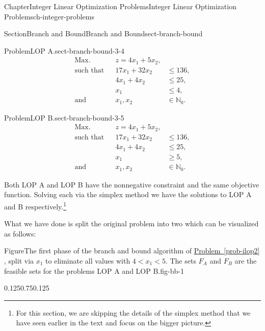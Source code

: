 \documentclass[oneside,10pt,]{book}
\newcommand{\xreffont}{\relax}
\numberwithin{equation}{section}
\newcommand{\lt}{<}
\newcommand{\amp}{&}
\begin{document}
\begin{chapterptx}{Chapter}{Integer Linear Optimization Problems}{}{Integer Linear Optimization Problems}{}{}{ch-integer-problems}
\begin{sectionptx}{Section}{Branch and Bound}{}{Branch and Bound}{}{}{sect-branch-bound}
\begin{introduction}{}
\begin{problem}{Problem}{LOP A.}{sect-branch-bound-3-4}%
%
\begin{equation*}
\begin{aligned} \text{Max.} \amp\amp z = 4x_1 + 5x_2, \amp \\ \text{such that}\amp\amp 17x_1+32x_2 \amp\leq 136, \\ \amp\amp 4x_1 + 4x_2 \amp\leq 25, \\ \amp\amp x_1 \amp \leq 4, \\ \text{and}\amp\amp x_1, x_2 \amp \in \mathbb{N}_0.
\end{aligned}
\end{equation*}
%
\end{problem}
\begin{problem}{Problem}{LOP B.}{sect-branch-bound-3-5}%
%
\begin{equation*}
\begin{aligned} \text{Max.} \amp\amp z = 4x_1 + 5x_2, \amp \\ \text{such that}\amp\amp 17x_1+32x_2 \amp\leq 136, \\ \amp\amp 4x_1 + 4x_2 \amp\leq 25, \\ \amp\amp x_1 \amp \geq 5, \\ \text{and}\amp\amp x_1, x_2 \amp \in \mathbb{N}_0.
\end{aligned}
\end{equation*}
%
\end{problem}
Both LOP A and LOP B have the nonnegative constraint and the same objective function. Solving each via the simplex method we have the solutions to LOP A and B respectively.\footnote{For this section, we are skipping the details of the simplex method that we have seen earlier in the text and focus on the bigger picture.\label{sect-branch-bound-3-6-1}}%
\par
What we have done is split the original problem into two which can be visualized as follows:%
\begin{figureptx}{Figure}{The first phase of the branch and bound algorithm of \hyperref[prob-ilop2]{Problem~{\xreffont\ref{prob-ilop2}}} , split via \(x_1\) to eliminate all values with \(4 \lt x_1 \lt 5\). The sets \(F_A\) and \(F_B\) are the feasible sets for the problems LOP A and LOP B.}{fig-bb-1}{}%
\begin{image}{0.125}{0.75}{0.125}{}%
\end{image}
\end{figureptx}
\end{introduction}
\end{sectionptx}
\end{chapterptx}
\end{document}
